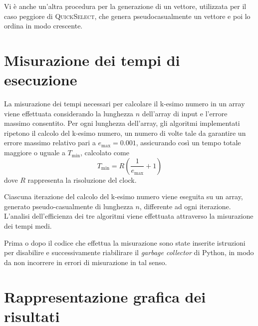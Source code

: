 \documentclass[a4paper,12pt]{article}
\newcommand{\QuickSelect}{\textsc{QuickSelect}}
\begin{document}
Vi è anche un'altra procedura per la generazione di un vettore, utilizzata per il caso peggiore di \QuickSelect{}, che genera pseudocasualmente un vettore e poi lo ordina in modo crescente.


\section{Misurazione dei tempi di esecuzione}
\label{sec:misurazione}
La misurazione dei tempi necessari per calcolare il k-esimo numero in un array viene effettuata considerando la lunghezza \( n \) dell'array di input e l'errore massimo consentito. Per ogni lunghezza dell'array, gli algoritmi implementati ripetono il calcolo del k-esimo numero, un numero di volte tale da garantire un errore massimo relativo pari a \( e_{\max} = 0.001 \), assicurando così un tempo totale maggiore o uguale a \( T_{\min} \), calcolato come \[ T_{\min} = R \left( \frac{1}{e_{\max}} + 1 \right) \] dove \( R \) rappresenta la risoluzione del clock.

Ciascuna iterazione del calcolo del k-esimo numero viene eseguita su un array, generato pseudo-casualmente di lunghezza \( n \), differente ad ogni iterazione.
L'analisi dell'efficienza dei tre algoritmi viene effettuata attraverso la misurazione dei tempi medi.

Prima o dopo il codice che effettua la misurazione sono state inserite istruzioni per disabilire e successivamente riabilirare il \emph{garbage collector} di Python, in modo da non incorrere in errori di misurazione in tal senso.


\newpage

\section{Rappresentazione grafica dei risultati}
\label{sec:grafici}
\end{document}
